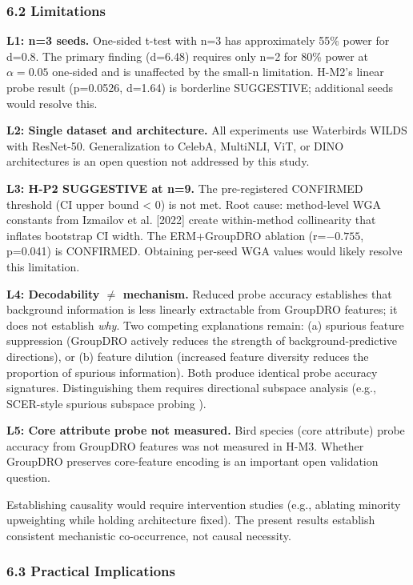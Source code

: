 \subsubsection{6.2 Limitations}

\textbf{L1: n=3 seeds.} One-sided t-test with n=3 has approximately 55\% power for d=0.8. The primary finding (d=6.48) requires only n=2 for 80\% power at $\alpha =0.05$ one-sided and is unaffected by the small-n limitation. H-M2's linear probe result (p=0.0526, d=1.64) is borderline SUGGESTIVE; additional seeds would resolve this.

\textbf{L2: Single dataset and architecture.} All experiments use Waterbirds WILDS with ResNet-50. Generalization to CelebA, MultiNLI, ViT, or DINO architectures is an open question not addressed by this study.

\textbf{L3: H-P2 SUGGESTIVE at n=9.} The pre-registered CONFIRMED threshold (CI upper bound < 0) is not met. Root cause: method-level WGA constants from Izmailov et al. [2022] create within-method collinearity that inflates bootstrap CI width. The ERM+GroupDRO ablation (r=$-0.755$, p=0.041) is CONFIRMED. Obtaining per-seed WGA values would likely resolve this limitation.

\textbf{L4: Decodability $\neq$ mechanism.} Reduced probe accuracy establishes that background information is less linearly extractable from GroupDRO features; it does not establish \textit{why}. Two competing explanations remain: (a) spurious feature suppression (GroupDRO actively reduces the strength of background-predictive directions), or (b) feature dilution (increased feature diversity reduces the proportion of spurious information). Both produce identical probe accuracy signatures. Distinguishing them requires directional subspace analysis (e.g., SCER-style spurious subspace probing \citep{park2025scer}).

\textbf{L5: Core attribute probe not measured.} Bird species (core attribute) probe accuracy from GroupDRO features was not measured in H-M3. Whether GroupDRO preserves core-feature encoding is an important open validation question.

Establishing causality would require intervention studies (e.g., ablating minority upweighting while holding architecture fixed). The present results establish consistent mechanistic co-occurrence, not causal necessity.

\subsubsection{6.3 Practical Implications}

